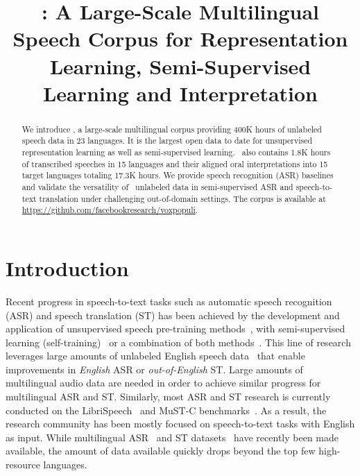 \title{\vp: A Large-Scale Multilingual Speech Corpus for Representation Learning, Semi-Supervised Learning and Interpretation}



\maketitle

\renewcommand{\thefootnote}{$^{\star}$}
\renewcommand{\thefootnote}{1}

\begin{abstract}
We introduce \vp, a large-scale multilingual corpus providing 400K hours of unlabeled speech data in 23 languages. It is the largest open data to date for unsupervised representation learning as well as semi-supervised learning. \vp~also contains 1.8K hours of transcribed speeches in 15 languages and their aligned oral interpretations into 15 target languages totaling 17.3K hours. We provide speech recognition (ASR) baselines and validate the versatility of \vp~unlabeled data in semi-supervised ASR and speech-to-text translation under challenging out-of-domain settings. The corpus is available
at \url{https://github.com/facebookresearch/voxpopuli}.
\end{abstract}

\section{Introduction}

Recent progress in speech-to-text tasks such as automatic speech recognition (ASR) and speech translation (ST) has been achieved by the development and application of unsupervised speech pre-training methods~\cite{oord2018representation,Schneider2019,baevski2020wav2vec,conneau2020unsupervised,Wu2020SelfSupervisedRI,Nguyen2020InvestigatingSP}, with semi-supervised learning (self-training)~\cite{kahn2020self,Pino2020SelfTrainingFE,zhang2020pushing,xu2020self} or a combination of both methods~\cite{xu2020self}.
This line of research leverages large amounts of unlabeled English speech data~\cite{kahn2020libri} that enable improvements in \emph{English} ASR or \emph{out-of-English} ST.
Large amounts of multilingual audio data are needed in order to achieve similar progress for multilingual ASR and ST.
Similarly, most ASR and ST research is currently conducted on the LibriSpeech~\cite{panayotov2015librispeech} and MuST-C benchmarks~\cite{cattoni2020must,di2019must}. As a result, the research community has been mostly focused on speech-to-text tasks with English as input.
While multilingual ASR~\cite{Pratap2020,ardila-etal-2020-common} and ST datasets~\cite{wang2020covost,iranzo2020europarl} have recently been made available, the amount of data available quickly drops beyond the top few high-resource languages.

